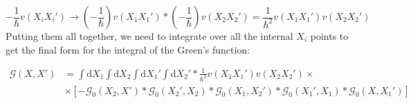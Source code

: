 \begin{equation}
- \frac{1}{\hbar} v \left( X_{i} X_{i}' \right)
\to
\left( - \frac{1}{\hbar} \right) v \left( X_{1} X_{1}' \right)
*
\left( - \frac{1}{\hbar} \right) v \left( X_{2} X_{2}' \right)
=
\frac{1}{\hbar^{2}} v \left( X_{1} X_{1}' \right) v \left( X_{2} X_{2}' \right)
\end{equation}
Putting them all together, we need to integrate over all the internal $X_{i}$ points to get the final form for the integral of the Green's function:

\begin{align}
\mathcal{G} \left( X, X' \right)
&=
\int \text{d}X_{1} \int \text{d}X_{2} \int \text{d}X_{1}' \int \text{d}X_{2}'
*
\frac{1}{\hbar^{2}} v \left( X_{1} X_{1}' \right) v \left( X_{2} X_{2}' \right)
\times \nonumber \\
&\times
\left[
- \mathcal{G}_{0} \left( X_{2}, X' \right)
*
\mathcal{G}_{0} \left( X_{2}', X_{2} \right)
*
\mathcal{G}_{0} \left( X_{1}, X_{2}' \right)
*
\mathcal{G}_{0} \left( X_{1}', X_{1} \right)
*
\mathcal{G}_{0} \left( X, X_{1}' \right)
\right]
\end{align}